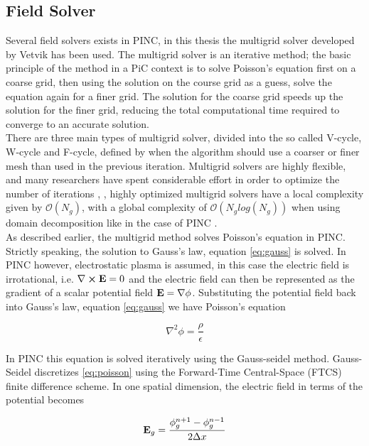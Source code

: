\subsection{Field Solver}
Several field solvers exists in PINC, in this thesis the multigrid solver developed by Vetvik  has been used. The multigrid solver is an iterative method; the basic principle of the method in a PiC context is to solve Poisson's equation first on a coarse grid, then using the solution on the course grid as a guess, solve the equation again for a finer grid. The solution for the coarse grid speeds up the solution for the finer grid, reducing the total computational time required to converge to an accurate solution. 
\\
There are three main types of multigrid solver, divided into the so called V-cycle, W-cycle and F-cycle, defined by when the algorithm should use a coarser or finer mesh than used in the previous iteration. Multigrid solvers are highly flexible, and many researchers have spent considerable effort in order to optimize the number of iterations , , highly optimized multigrid solvers have a local complexity given by $\mathcal{O}(N_g)$, with a global complexity of $\mathcal{O}(N_g log(N_g))$ when using domain decomposition like in the case of PINC .
\\
As described earlier, the multigrid method solves Poisson's equation in PINC. Strictly speaking, the solution to Gauss's law, equation \ref{eq:gauss} is solved. In PINC however, electrostatic plasma is assumed, in this case the electric field is irrotational, i.e. $\nabla \cross \vb{E} = 0$ and the electric field can then be represented as the gradient of a scalar potential field $\vb{E} = \nabla \phi$.  Substituting the potential field back into Gauss's law, equation \ref{eq:gauss} we have Poisson's equation

\begin{equation}\label{eq:poisson}
    \nabla^2 \phi = \frac{\rho}{\epsilon}
\end{equation}

In PINC this equation is solved iteratively using the Gauss-seidel method. Gauss-Seidel discretizes \ref{eq:poisson} using the Forward-Time Central-Space (FTCS) finite difference scheme. In one spatial dimension, the electric field in terms of the potential becomes

\begin{equation}\label{eq:Ediscrete}
    \vb{E}_g = \frac{\phi^{n+1}_g - \phi^{n-1}_g}{2\Delta x}
\end{equation}

